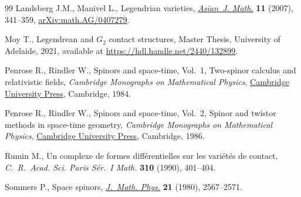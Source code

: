 \begin{thebibliography}{99}
Landsberg J.M., Manivel L., Legendrian varieties, \href{https://doi.org/10.4310/AJM.2007.v11.n3.a1}{\textit{Asian~J. Math.}}
 \textbf{11} (2007), 341--359, \href{https://arxiv.org/abs/math.AG/0407279}{arXiv:math.AG/0407279}.

Moy T., Legendrean and $G_2$ contact structures, {M}aster {T}hesis, University
 of Adelaide, 2021, available at \url{https://hdl.handle.net/2440/132899}.

Penrose R., Rindler W., Spinors and space-time, {V}ol.~1, Two-spinor calculus
 and relativistic fields, \textit{Cambridge Monographs on Mathematical Physics},
 \href{https://doi.org/10.1017/CBO9780511564048}{Cambridge University Press}, Cambridge, 1984.

Penrose R., Rindler W., Spinors and space-time, {V}ol.~2, {S}pinor and twistor
 methods in space-time geometry, \textit{Cambridge Monographs on Mathematical Physics},
 \href{https://doi.org/10.1017/CBO9780511524486}{Cambridge University Press}, Cambridge, 1986.

Rumin M., Un complexe de formes diff\'erentielles sur les vari\'et\'es de
 contact, \textit{C.~R.~Acad. Sci. Paris S\'er.~I Math.} \textbf{310} (1990),
 401--404.

Sommers P., Space spinors, \href{https://doi.org/10.1063/1.524351}{\textit{J.~Math. Phys.}} \textbf{21} (1980),
 2567--2571.

\end{thebibliography}
